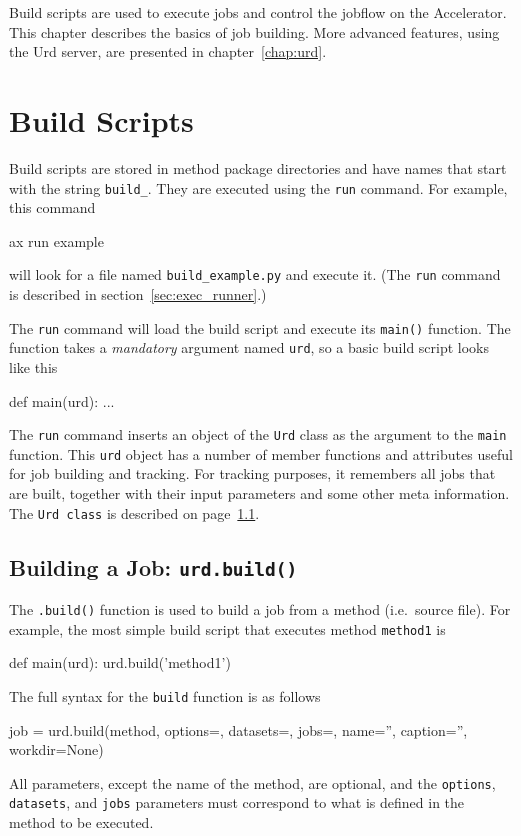 \label{chap:urd_basic}

Build scripts are used to execute jobs and control the jobflow on the
Accelerator.  This chapter describes the basics of job building.  More
advanced features, using the Urd server, are presented in
chapter~\ref{chap:urd}.



\section{Build Scripts}
Build scripts are stored in method package directories and have names
that start with the string \texttt{build\_}.  They are executed using
the \texttt{run} command.  For example, this command
\begin{shell}
ax run example
\end{shell}
will look for a file named \texttt{build\_example.py} and execute it.
(The \texttt{run} command is described in
section~\ref{sec:exec_runner}.)

The \texttt{run} command will load the build script and execute
its \texttt{main()} function.  The function takes a \textsl{mandatory}
argument named \texttt{urd}, so a basic build script looks like this
\begin{python}
def main(urd):
    ...
\end{python}
The \texttt{run} command inserts an object of the \texttt{Urd} class
as the argument to the \texttt{main} function.  This \texttt{urd}
object has a number of member functions and attributes useful for job
building and tracking.  For tracking purposes, it remembers all jobs
that are built, together with their input parameters and some other
meta information.  The \texttt{Urd class} is described on
page~\ref{}.



\subsection{Building a Job: \texttt{urd.build()}}
The \texttt{.build()} function is used to build a job from a method
(i.e.\ source file).  For example, the most simple build script that
executes method \texttt{method1} is
\begin{python}
def main(urd):
    urd.build('method1')
\end{python}
The full syntax for the \texttt{build} function is as follows
\begin{python}
job = urd.build(method,
                options={}, datasets={}, jobs={},
                name='', caption='', workdir=None)
\end{python}
All parameters, except the name of the method, are optional, and
the \texttt{options}, \texttt{datasets}, and \texttt{jobs}
parameters must correspond to what is defined in the method to be
executed.

